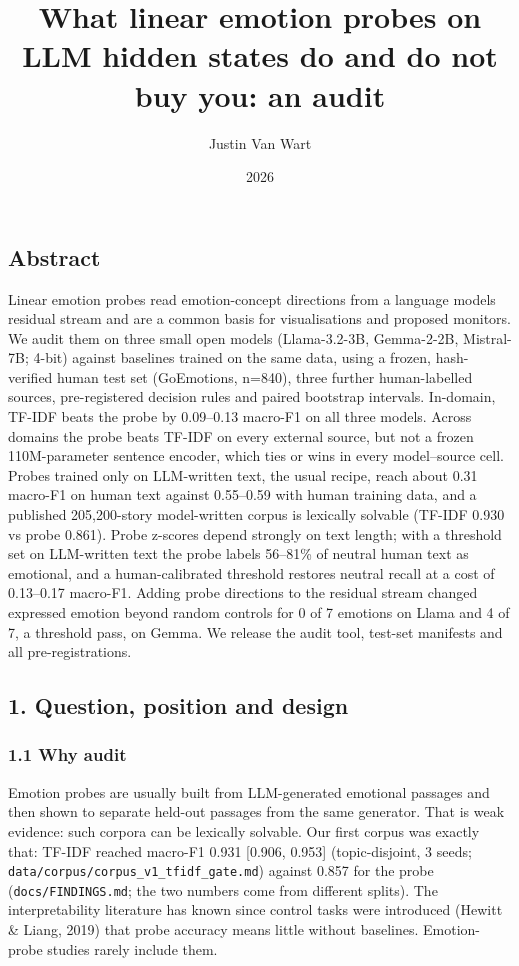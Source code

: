 \documentclass[
  10pt,
]{article}
\title{What linear emotion probes on LLM hidden states do and do not buy
you: an audit}
\author{Justin Van Wart}
\date{2026}
\begin{document}
\maketitle

{
\setcounter{tocdepth}{2}
\tableofcontents
}
\subsection{Abstract}\label{abstract}

Linear emotion probes read emotion-concept directions from a language
model\textquotesingle s residual stream and are a common basis for
visualisations and proposed monitors. We audit them on three small open
models (Llama-3.2-3B, Gemma-2-2B, Mistral-7B; 4-bit) against baselines
trained on the same data, using a frozen, hash-verified human test set
(GoEmotions, n=840), three further human-labelled sources,
pre-registered decision rules and paired bootstrap intervals. In-domain,
TF-IDF beats the probe by 0.09--0.13 macro-F1 on all three models.
Across domains the probe beats TF-IDF on every external source, but not
a frozen 110M-parameter sentence encoder, which ties or wins in every
model--source cell. Probes trained only on LLM-written text, the usual
recipe, reach about 0.31 macro-F1 on human text against 0.55--0.59 with
human training data, and a published 205,200-story model-written corpus
is lexically solvable (TF-IDF 0.930 vs probe 0.861). Probe z-scores
depend strongly on text length; with a threshold set on LLM-written text
the probe labels 56--81\% of neutral human text as emotional, and a
human-calibrated threshold restores neutral recall at a cost of
0.13--0.17 macro-F1. Adding probe directions to the residual stream
changed expressed emotion beyond random controls for 0 of 7 emotions on
Llama and 4 of 7, a threshold pass, on Gemma. We release the audit tool,
test-set manifests and all pre-registrations.

\subsection{1. Question, position and
design}\label{1-question-position-and-design}

\subsubsection{1.1 Why audit}\label{11-why-audit}

Emotion probes are usually built from LLM-generated emotional passages
and then shown to separate held-out passages from the same generator.
That is weak evidence: such corpora can be lexically solvable. Our first
corpus was exactly that: TF-IDF reached macro-F1 0.931 {[}0.906,
0.953{]} (topic-disjoint, 3 seeds;
\texttt{data/corpus/corpus\_v1\_tfidf\_gate.md}) against 0.857 for the
probe (\texttt{docs/FINDINGS.md}; the two numbers come from different
splits). The interpretability literature has known since control tasks
were introduced (Hewitt \& Liang, 2019) that probe accuracy means little
without baselines. Emotion-probe studies rarely include them.
\end{document}
